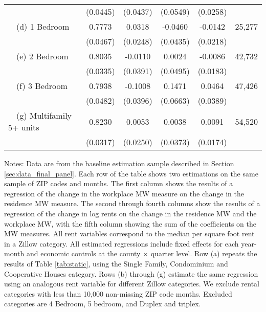 \begin{landscape}
\begin{table}[ht!]
\begin{tabular}{@{}lccccc@{}}
                                                 & (0.0445) & (0.0437) & (0.0549) & (0.0258) &      \\
        $\quad$(d) 1 Bedroom                     &  0.7773  &  0.0318  &  -0.0460  &  -0.0142  & 25,277 \\
                                                 & (0.0467) & (0.0248) & (0.0435) & (0.0218) &      \\
        $\quad$(e) 2 Bedroom                     &  0.8035  &  -0.0110  &  0.0024  &  -0.0086  & 42,732 \\
                                                 & (0.0335) & (0.0391) & (0.0495) & (0.0183) &      \\
        $\quad$(f) 3 Bedroom                     &  0.7938  &  -0.1008  &  0.1471  &  0.0464  & 47,426 \\
                                                 & (0.0482) & (0.0396) & (0.0663) & (0.0389) &      \\
        $\quad$(g) Multifamily 5+ units          &  0.8230  &  0.0053  &  0.0038  &  0.0091  & 54,520 \\
                                                 & (0.0317) & (0.0250) & (0.0373) & (0.0174) &      \\ \bottomrule
    \end{tabular}

    \begin{minipage}{.95\linewidth} \footnotesize
        \vspace{2mm}
        Notes:
        Data are from the baseline estimation sample described in Section 
        \ref{sec:data_final_panel}.
        Each row of the table shows two estimations on the same sample of ZIP 
        codes and months.
        The first column shows the results of a regression of the change in the 
        workplace MW measure on the change in the residence MW measure.
        The second through fourth columns show the results of a regression of 
        the change in log rents on the change in the residence MW and the 
        workplace MW, with the fifth column showing the sum of the coefficients 
        on the MW measures.
        All rent variables correspond to the median per square foot rent in a 
        Zillow category.
        All estimated regressions include fixed effects for each year-month and 
        economic controls at the county $\times$ quarter level.
        Row (a) repeats the results of Table \ref{tab:static}, using the 
        Single Family, Condominium and Cooperative Houses category.
        Rows (b) through (g) estimate the same regression using an analogous 
        rent variable for different Zillow categories.
        We exclude rental categories with less than 10,000 non-missing ZIP code months.
        Excluded categories are 4 Bedroom, 5 bedroom, and Duplex and triplex.
    \end{minipage}
\end{table}
\end{landscape}
